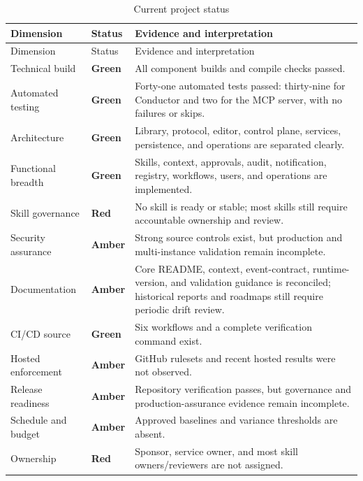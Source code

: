 \documentclass[12pt]{report}
\newcommand{\statusgreen}[1]{\textcolor{statusgreen}{\textbf{#1}}}
\newcommand{\statusamber}[1]{\textcolor{statusamber}{\textbf{#1}}}
\newcommand{\statusred}[1]{\textcolor{statusred}{\textbf{#1}}}
\begin{document}
\begin{longtable}{p{}p{}p{}}
\caption{Current project status}\label{tab:status}\\
\toprule
Dimension & Status & Evidence and interpretation \\
\midrule
\endfirsthead
\toprule
Dimension & Status & Evidence and interpretation \\
\midrule
\endhead
Technical build & \statusgreen{Green} & All component builds and compile checks passed. \\
Automated testing & \statusgreen{Green} & Forty-one automated tests passed: thirty-nine for Conductor and two for the MCP server, with no failures or skips. \\
Architecture & \statusgreen{Green} & Library, protocol, editor, control plane, services, persistence, and operations are separated clearly. \\
Functional breadth & \statusgreen{Green} & Skills, context, approvals, audit, notification, registry, workflows, users, and operations are implemented. \\
Skill governance & \statusred{Red} & No skill is ready or stable; most skills still require accountable ownership and review. \\
Security assurance & \statusamber{Amber} & Strong source controls exist, but production and multi-instance validation remain incomplete. \\
Documentation & \statusamber{Amber} & Core README, context, event-contract, runtime-version, and validation guidance is reconciled; historical reports and roadmaps still require periodic drift review. \\
CI/CD source & \statusgreen{Green} & Six workflows and a complete verification command exist. \\
Hosted enforcement & \statusamber{Amber} & GitHub rulesets and recent hosted results were not observed. \\
Release readiness & \statusamber{Amber} & Repository verification passes, but governance and production-assurance evidence remain incomplete. \\
Schedule and budget & \statusamber{Amber} & Approved baselines and variance thresholds are absent. \\
Ownership & \statusred{Red} & Sponsor, service owner, and most skill owners/reviewers are not assigned. \\
\bottomrule
\end{longtable}
\end{document}
